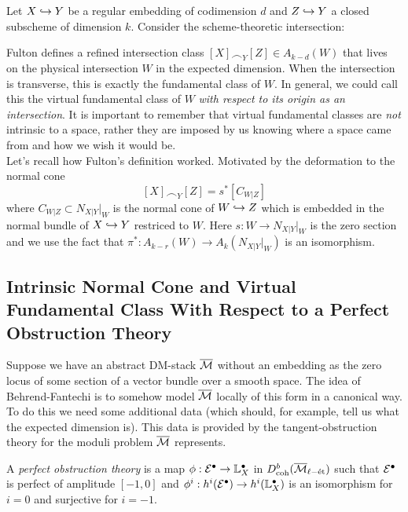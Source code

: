 \documentclass[12pt]{article}
\newcommand{\Mbar}{\ol{\M}}
\begin{document}
Let $X \hookrightarrow Y$ be a regular embedding of codimension $d$ and $Z \hookrightarrow Y$ a closed subscheme of dimension $k$. Consider the scheme-theoretic intersection:
\begin{center}
\end{center}
Fulton defines a refined intersection class $[X] \frown_Y [Z] \in A_{k-d}(W)$ that lives on the physical intersection $W$ in the expected dimension. When the intersection is transverse, this is exactly the fundamental class of $W$. In general, we could call this the virtual fundamental class of $W$ \textit{with respect to its origin as an intersection}. It is important to remember that virtual fundamental classes are \textit{not} intrinsic to a space, rather they are imposed by us knowing where a space came from and how we wish it would be.
\bigskip\\
Let's recall how Fulton's definition worked. Motivated by the deformation to the normal cone
\[ [X] \frown_Y [Z] = s^* [C_{W|Z}] \]
where $C_{W|Z} \subset N_{X|Y}|_{W}$ is the normal cone of $W \hookrightarrow Z$ which is embedded in the normal bundle of $X \hookrightarrow Y$ restriced to $W$. Here $s : W \to N_{X|Y}|_W$ is the zero section and we use the fact that $\pi^* : A_{k-r}(W) \to A_k(N_{X|Y}|_W)$ is an isomorphism. 

\subsection{Intrinsic Normal Cone and Virtual Fundamental Class With Respect to a Perfect Obstruction Theory}

Suppose we have an abstract DM-stack $\Mbar$ without an embedding as the zero locus of some section of a vector bundle over a smooth space. The idea of Behrend-Fantechi is to somehow model $\Mbar$ locally of this form in a canonical way. To do this we need some additional data (which should, for example, tell us what the expected dimension is). This data is provided by the tangent-obstruction theory for the moduli problem $\Mbar$ represents. 

\newcommand{\lisset}{\ell\mathrm{-\et}}
\newcommand{\cN}{\mathcal{N}}

\begin{defn}
A \textit{perfect obstruction theory} is a map $\phi : \mathcal{E}^\bullet \to \mathbb{L}_X^\bullet$ in $D^b_{\text{coh}}(\Mbar_{\lisset})$ such that $\mathcal{E}^\bullet$ is perfect of amplitude $[-1,0]$ and $\phi^i : h^i(\mathcal{E}^\bullet) \to h^i(\mathbb{L}_X^\bullet)$ is an isomorphism for $i = 0$ and surjective for $i = -1$. 
\end{defn}
\end{document}
